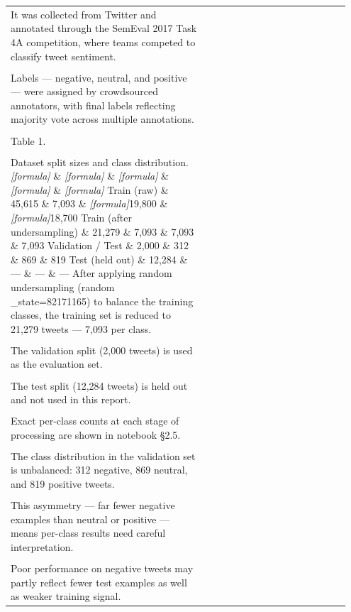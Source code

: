 \documentclass[11pt]{article}
\begin{document}
\begin{longtable}{|p{0.55\linewidth}|p{0.40\linewidth}|}
\hline
\rule{0pt}{3.5cm} & \\
\hline
It was collected from Twitter and annotated through the SemEval 2017 Task 4A competition, where teams competed to classify tweet sentiment. & \\[2pt]
\hline
\rule{0pt}{3.5cm} & \\
\hline
Labels --- negative, neutral, and positive --- were assigned by crowdsourced annotators, with final labels reflecting majority vote across multiple annotations. & \\[2pt]
\hline
\rule{0pt}{3.5cm} & \\
\hline
Table 1. & \\[2pt]
\hline
\rule{0pt}{3.5cm} & \\
\hline
Dataset split sizes and class distribution. \textit{[formula]} \& \textit{[formula]} \& \textit{[formula]} \& \textit{[formula]} \& \textit{[formula]} Train (raw) \& 45,615 \& 7,093 \& \textit{[formula]}19,800 \& \textit{[formula]}18,700 Train (after undersampling) \& 21,279 \& 7,093 \& 7,093 \& 7,093 Validation / Test \& 2,000 \& 312 \& 869 \& 819 Test (held out) \& 12,284 \& --- \& --- \& --- After applying random undersampling (random \_state=82171165) to balance the training classes, the training set is reduced to 21,279 tweets --- 7,093 per class. & \\[2pt]
\hline
\rule{0pt}{3.5cm} & \\
\hline
The validation split (2,000 tweets) is used as the evaluation set. & \\[2pt]
\hline
\rule{0pt}{3.5cm} & \\
\hline
The test split (12,284 tweets) is held out and not used in this report. & \\[2pt]
\hline
\rule{0pt}{3.5cm} & \\
\hline
Exact per-class counts at each stage of processing are shown in notebook §2.5. & \\[2pt]
\hline
\rule{0pt}{3.5cm} & \\
\hline
The class distribution in the validation set is unbalanced: 312 negative, 869 neutral, and 819 positive tweets. & \\[2pt]
\hline
\rule{0pt}{3.5cm} & \\
\hline
This asymmetry --- far fewer negative examples than neutral or positive --- means per-class results need careful interpretation. & \\[2pt]
\hline
\rule{0pt}{3.5cm} & \\
\hline
Poor performance on negative tweets may partly reflect fewer test examples as well as weaker training signal. & \\[2pt]

\end{longtable}
\end{document}
